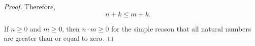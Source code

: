 \begin{proof}
  Therefore,
  \begin{equation*}
    n + k \leq m + k.
  \end{equation*}

   If \( n \geq 0 \) and \( m \geq 0 \), then \( n \cdot m \geq 0 \) for the simple reason that all natural numbers are greater than or equal to zero.
\end{proof}
